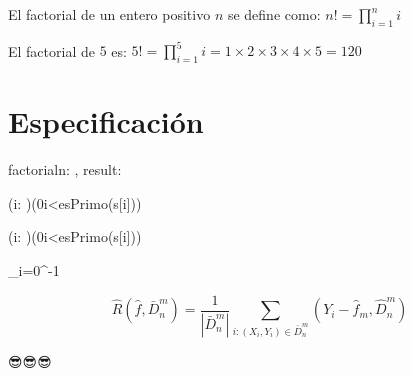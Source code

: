 \documentclass[11pt]{article}
\begin{document}
\maketitle
\tableofcontents
\newpage

El factorial de un entero positivo $n$ se define como:
$n! = \prod_{i=1}^{n}i$

El factorial de $5$ es: %
$5! = \prod_{i=1}^{5}i=1\times2\times3\times4\times5=120$

\section{Especificación}
\begin{proc}{factorial}{\In n: \ent, \Out result: \ent}{}
\end{proc}

{(\forall i: \ent)(0\leq i<\implicaLuego esPrimo(s[i]))}

{(\exists i: \ent)(0\leq i<\yLuego esPrimo(s[i]))}

{\sum_{i=0}^{-1}}

$$
	\hat{R}(\hat{f},\bar{D}_n^m)=\frac{1}{|\bar{D}_n^m|}
	\sum_{i:(X_i,Y_i)\in \bar{D}_n^m}(Y_i-\hat{f}_m,\hat{D}_n^m)
$$

😎😎😎
\end{document}
